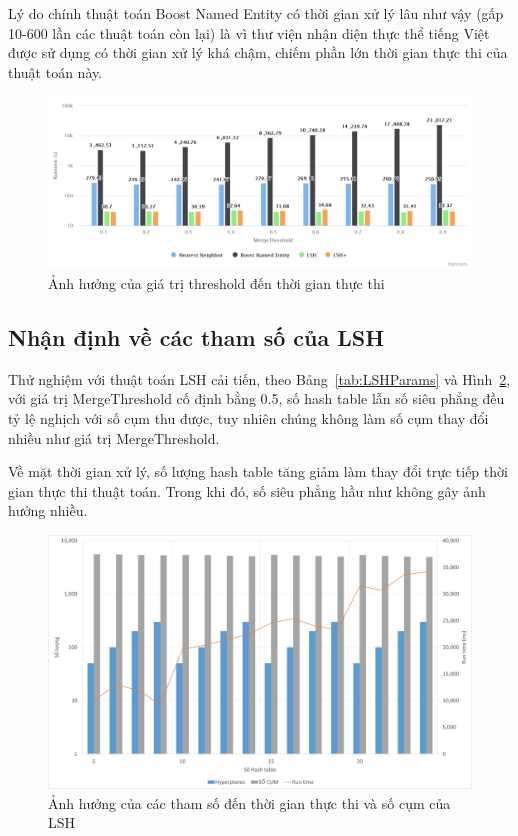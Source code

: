 	Lý do chính thuật toán Boost Named Entity có thời gian xử lý lâu như vậy (gấp 10-600 lần các thuật toán còn lại) là vì thư viện nhận diện thực thể tiếng Việt được sử dụng có thời gian xử lý khá chậm, chiếm phần lớn thời gian thực thi của thuật toán này.
		\begin{figure}
			\centering
			\includegraphics[width=1\linewidth]{Chapter4/Chapter4Figs/ThresholdVsRuntime}
			\caption{Ảnh hưởng của giá trị threshold đến thời gian thực thi}
			\label{fig:thresholdvsruntime}
		\end{figure}

	\subsection{Nhận định về các tham số của LSH}
	Thử nghiệm với thuật toán LSH cải tiến, theo Bảng~\ref{tab:LSHParams} và Hình~\ref{fig:lshruntime}, với giá trị MergeThreshold cố định bằng 0.5, số hash table lẫn số siêu phẳng đều tỷ lệ nghịch với số cụm thu được, tuy nhiên chúng không làm số cụm thay đổi nhiều như giá trị MergeThreshold.
	
	Về mặt thời gian xử lý, số lượng hash table tăng giảm làm thay đổi trực tiếp thời gian thực thi thuật toán. Trong khi đó, số siêu phẳng hầu như không gây ảnh hưởng nhiều.

	\begin{figure}
		\includegraphics[width=1\linewidth]{Chapter4/Chapter4Figs/LSHRuntime}
		\caption{Ảnh hưởng của các tham số đến thời gian thực thi và số cụm của LSH}
		\label{fig:lshruntime}
	\end{figure}
	
